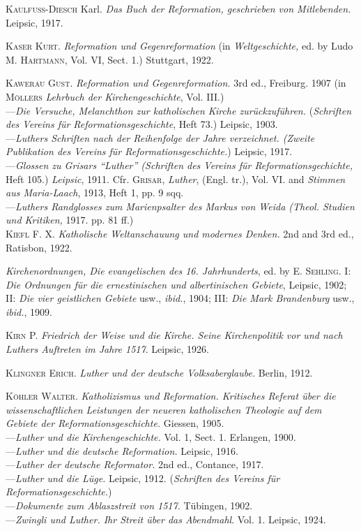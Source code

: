 \textsc{Kaulfuss-Diesch} Karl. \textit{Das Buch der Reformation, geschrieben von Mitlebenden.}
Leipsic, 1917.

\textsc{Kaser Kurt.} \textit{Reformation und Gegenreformation} (in \textit{Weltgeschichte,} ed.
by Ludo \textsc{M. Hartmann}, Vol. VI, Sect. 1.) Stuttgart, 1922.

\textsc{Kawerau Gust.} \textit{Reformation und Gegenreformation.} 3rd ed., Freiburg. 1907
(in \textsc{Möllers} \textit{Lehrbuch der Kirchengeschichte}, Vol. III.) \\
---\textit{Die Versuche, Melanchthon zur katholischen Kirche zurückzuführen.}
(\textit{Schriften des Vereins für Reformationsgeschichte}, Heft 73.) Leipsic,
1903. \\
---\textit{Luthers Schriften nach der Reihenfolge der Jahre verzeichnet. (Zweite
Publikation des Vereins für Reformationsgeschichte.}) Leipsic, 1917. \\
---\textit{Glossen zu Grisars “Luther” (Schriften des Vereins für Reformationsgechichte,}
Heft 105.) \textit{Leipsic}, 1911. Cfr. \textsc{Grisar}, \textit{Luther}, (Engl. tr.), Vol.
VI. and \textit{Stimmen aus Maria-Laach}, 1913, Heft 1, pp. 9 sqq. \\
---\textit{Luthers Randglosses zum Marienpsalter des Markus von Weida (Theol.
Studien und Kritiken,} 1917. pp. 81 ff.) \\

\textsc{Kiefl F. X.} \textit{Katholische Weltanschauung und modernes Denken.} 2nd and
3rd ed., Ratisbon, 1922.

\textit{Kirchenordnungen, Die evangelischen des 16. Jahrhunderts}, ed. by \textsc{E. Sehling.}
I: \textit{Die Ordnungen für die ernestinischen und albertinischen Gebiete}, Leipsic, 1902;
II: \textit{Die vier geistlichen Gebiete} usw., \textit{ibid.}, 1904;
III: \textit{Die Mark Brandenburg} usw., \textit{ibid.}, 1909.

\textsc{Kirn P.} \textit{Friedrich der Weise und die Kirche. Seine Kirchenpolitik vor und
nach Luthers Auftreten im Jahre 1517}. Leipsic, 1926.

\textsc{Klingner Erich.} \textit{Luther und der deutsche Volksaberglaube.} Berlin, 1912.

\textsc{Köhler Walter}. \textit{Katholizismus und Reformation. Kritisches Referat über
die wissenschaftlichen Leistungen der neueren katholischen Theologie auf
dem Gebiete der Reformationsgeschichte.} Giessen, 1905. \\
---\textit{Luther und die Kirchengeschichte.} Vol. 1, Sect. 1. Erlangen, 1900. \\
---\textit{Luther und die deutsche Reformation.} Leipsic, 1916. \\
---\textit{Luther der deutsche Reformator.} 2nd ed., Contance, 1917. \\
---\textit{Luther und die Lüge.} Leipsic, 1912. (\textit{Schriften des Vereins für Reformationsgeschichte.}) \\
---\textit{Dokumente zum Ablaszstreit von 1517.} Tübingen, 1902. \\
---\textit{Zwingli und Luther. Ihr Streit über das Abendmahl}. Vol. 1. Leipsic,
1924. \\

